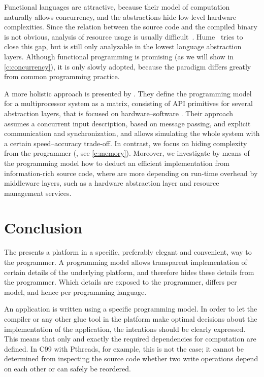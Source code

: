 Functional languages are attractive, because their model of computation naturally allows concurrency, and the abstractions hide low-level hardware complexities.
Since the relation between the source code and the compiled binary is not obvious, analysis of resource usage is usually difficult~\cite{hammond:hume}.
Hume~\cite{hammond:hume} tries to close this gap, but is still only analyzable in the lowest language abstraction layers.
Although functional programming is promising (as we will show in \cref{c:concurrency}), it is only slowly adopted, because the paradigm differs greatly from common programming practice.

A more holistic approach is presented by \citet{jerraya:programming_models}.
They define the programming model for a multiprocessor system as a matrix, consisting of \ac{API} primitives for several abstraction layers, that is focused on hardware--software \codesign.
Their approach assumes a concurrent input description, based on message passing, and explicit communication and synchronization, and allows simulating the whole system with a certain speed--accuracy trade-off.
In contrast, we focus on hiding complexity from the programmer (\eg, see \cref{c:memory}).
Moreover, we investigate by means of the programming model how to deduct an efficient implementation from information-rich source code, where \citeauthor{jerraya:programming_models} are more depending on run-time overhead by middleware layers, such as a hardware abstraction layer and resource management services.


\section{Conclusion}

The  presents a platform in a specific, preferably elegant and convenient, way to the programmer.
A programming model allows transparent implementation of certain details of the underlying platform, and therefore hides these details from the programmer.
Which details are exposed to the programmer, differs per model, and hence per programming language.

An application is written using a specific programming model.
In order to let the compiler or any other glue tool in the platform make optimal decisions about the implementation of the application, the intentions should be clearly expressed.
This means that only and exactly the required dependencies for computation are defined.
In C99 with Pthreads, for example, this is not the case; it cannot be determined from inspecting the source code whether two write operations depend on each other or can safely be reordered.

